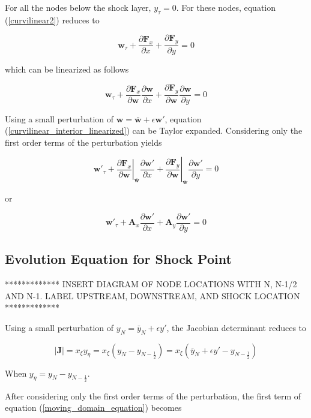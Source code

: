 \documentclass[10pt]{article}
\begin{document}
	For all the nodes below the shock layer, $y_\tau = 0$. For these nodes, equation (\ref{curvilinear2}) reduces to 
	
	$$ \mathbf{w}_\tau  + \frac{\partial \mathbf{F}_x}{\partial x} + \frac{\partial \mathbf{F}_y}{\partial y} = 0 $$
	
	
	which can be linearized as follows
	
	\begin{equation} \label{curvilinear_interior_linearized}
	\mathbf{w}_\tau  + \frac{\partial \mathbf{F}_x}{\partial \mathbf{w}} \frac{\partial \mathbf{w}}{\partial x}+ \frac{\partial \mathbf{F}_y}{\partial \mathbf{w}} \frac{\partial \mathbf{w}}{\partial y} = 0
	\end{equation}

	Using a small perturbation of $\mathbf{w} = \bar{\mathbf{w}} + \epsilon \mathbf{w}'$, equation (\ref{curvilinear_interior_linearized}) can be Taylor expanded. Considering only the first order terms of the perturbation yields
	
	$$ \mathbf{w}'_\tau  + \left. \frac{\partial \mathbf{F}_x}{\partial \mathbf{w}} \right|_{\bar{\mathbf{w}}} \frac{\partial \mathbf{w}'}{\partial x} + \left. \frac{\partial \mathbf{F}_y}{\partial \mathbf{w}} \right|_{\bar{\mathbf{w}}} \frac{\partial \mathbf{w}'}{\partial y} = 0 $$
	
	or
	
	\begin{equation} \label{curvilinear_interior_expanded}
		\mathbf{w}'_\tau  + \mathbf{A}_x \frac{\partial \mathbf{w}'}{\partial x} + \mathbf{A}_y \frac{\partial \mathbf{w}'}{\partial y} = 0
	\end{equation}
	
	\subsection{Evolution Equation for Shock Point}
	
	************* INSERT DIAGRAM OF NODE LOCATIONS WITH N, N-1/2 AND N-1. LABEL UPSTREAM, DOWNSTREAM, AND SHOCK LOCATION  *************
	
	Using a small perturbation of $y_N = \bar{y}_N + \epsilon y'$, the Jacobian determinant reduces to
	
	$$ |\mathbf{J}| = x_\xi y_\eta = x_\xi (y_N - y_{N-\frac{1}{2}}) = x_\xi (\bar{y}_N + \epsilon y' - y_{N-\frac{1}{2}}) $$
	
	When $y_\eta = y_N - y_{N-\frac{1}{2}}$.
	
	After considering only the first order terms of the perturbation, the first term of equation (\ref{moving_domain_equation}) becomes
	
\end{document}

